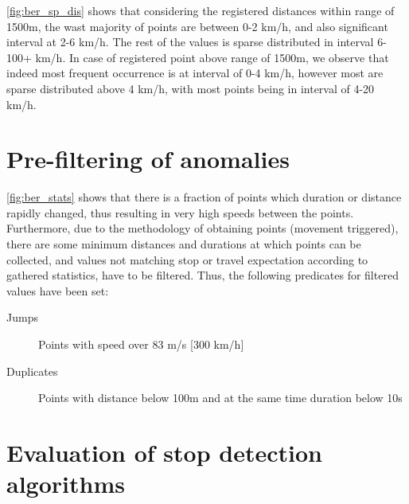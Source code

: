 \FloatBarrier
\autoref{fig:ber_sp_dis} shows that considering the registered distances within range of 1500m, the wast majority of points are between 0-2 km/h, and also significant interval at 2-6 km/h. The rest of the values is sparse distributed in interval 6-100+ km/h. In case of registered point above range of 1500m, we observe that indeed most frequent occurrence is at interval of 0-4 km/h, however most are sparse distributed above 4 km/h, with most points being in interval of 4-20 km/h. 

\section{Pre-filtering of anomalies}
\label{cha:prefilter}
\autoref{fig:ber_stats} shows that there is a fraction of points which duration or distance rapidly changed, thus resulting in very high speeds between the points. Furthermore, due to the methodology of obtaining points (movement triggered), there are some minimum distances and durations at which points can be collected, and values not matching stop or travel expectation according to gathered statistics, have to be filtered. Thus, the following predicates for filtered values have been set:
\begin{description}
	\item[Jumps] Points with speed over 83 m/s [300 km/h]
	\item[Duplicates] Points with distance below 100m and at the same time duration below 10s
\end{description}

\section{Evaluation of stop detection algorithms}

